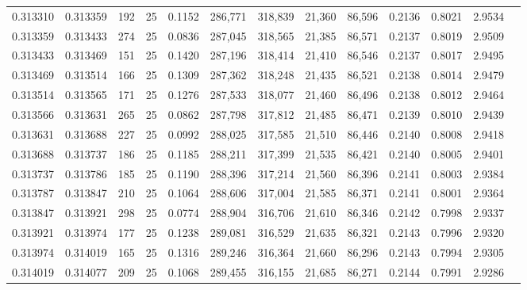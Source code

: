 \begin{tabular}{rrrrrrrrrrrrr}
0.313310 & 0.313359 &   192 &  25 &                                     0.1152 & 286,771 & 318,839 &  21,360 &  86,596 & 0.2136 & 0.8021 & 2.9534 \\
0.313359 & 0.313433 &   274 &  25 &                                     0.0836 & 287,045 & 318,565 &  21,385 &  86,571 & 0.2137 & 0.8019 & 2.9509 \\
0.313433 & 0.313469 &   151 &  25 &                                     0.1420 & 287,196 & 318,414 &  21,410 &  86,546 & 0.2137 & 0.8017 & 2.9495 \\
0.313469 & 0.313514 &   166 &  25 &                                     0.1309 & 287,362 & 318,248 &  21,435 &  86,521 & 0.2138 & 0.8014 & 2.9479 \\
0.313514 & 0.313565 &   171 &  25 &                                     0.1276 & 287,533 & 318,077 &  21,460 &  86,496 & 0.2138 & 0.8012 & 2.9464 \\
0.313566 & 0.313631 &   265 &  25 &                                     0.0862 & 287,798 & 317,812 &  21,485 &  86,471 & 0.2139 & 0.8010 & 2.9439 \\
0.313631 & 0.313688 &   227 &  25 &                                     0.0992 & 288,025 & 317,585 &  21,510 &  86,446 & 0.2140 & 0.8008 & 2.9418 \\
0.313688 & 0.313737 &   186 &  25 &                                     0.1185 & 288,211 & 317,399 &  21,535 &  86,421 & 0.2140 & 0.8005 & 2.9401 \\
0.313737 & 0.313786 &   185 &  25 &                                     0.1190 & 288,396 & 317,214 &  21,560 &  86,396 & 0.2141 & 0.8003 & 2.9384 \\
0.313787 & 0.313847 &   210 &  25 &                                     0.1064 & 288,606 & 317,004 &  21,585 &  86,371 & 0.2141 & 0.8001 & 2.9364 \\
0.313847 & 0.313921 &   298 &  25 &                                     0.0774 & 288,904 & 316,706 &  21,610 &  86,346 & 0.2142 & 0.7998 & 2.9337 \\
0.313921 & 0.313974 &   177 &  25 &                                     0.1238 & 289,081 & 316,529 &  21,635 &  86,321 & 0.2143 & 0.7996 & 2.9320 \\
0.313974 & 0.314019 &   165 &  25 &                                     0.1316 & 289,246 & 316,364 &  21,660 &  86,296 & 0.2143 & 0.7994 & 2.9305 \\
0.314019 & 0.314077 &   209 &  25 &                                     0.1068 & 289,455 & 316,155 &  21,685 &  86,271 & 0.2144 & 0.7991 & 2.9286 \\

\end{tabular}

